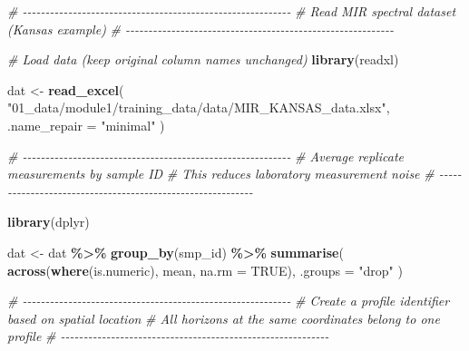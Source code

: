 \documentclass[
  10pt,
  b5paper,
  oneside]{book}
\newenvironment{Shaded}{\begin{snugshade}}{\end{snugshade}}
\newcommand{\AttributeTok}[1]{\textcolor[rgb]{0.13,0.29,0.53}{#1}}
\newcommand{\CommentTok}[1]{\textcolor[rgb]{0.56,0.35,0.01}{\textit{#1}}}
\newcommand{\ConstantTok}[1]{\textcolor[rgb]{0.56,0.35,0.01}{#1}}
\newcommand{\FunctionTok}[1]{\textcolor[rgb]{0.13,0.29,0.53}{\textbf{#1}}}
\newcommand{\NormalTok}[1]{#1}
\newcommand{\OtherTok}[1]{\textcolor[rgb]{0.56,0.35,0.01}{#1}}
\newcommand{\SpecialCharTok}[1]{\textcolor[rgb]{0.81,0.36,0.00}{\textbf{#1}}}
\newcommand{\StringTok}[1]{\textcolor[rgb]{0.31,0.60,0.02}{#1}}
\begin{document}
\begin{Shaded}
\begin{Highlighting}[]
\CommentTok{\# {-}{-}{-}{-}{-}{-}{-}{-}{-}{-}{-}{-}{-}{-}{-}{-}{-}{-}{-}{-}{-}{-}{-}{-}{-}{-}{-}{-}{-}{-}{-}{-}{-}{-}{-}{-}{-}{-}{-}{-}{-}{-}{-}{-}{-}{-}{-}{-}{-}{-}{-}{-}{-}{-}{-}{-}{-}{-}{-}}
\CommentTok{\# Read MIR spectral dataset (Kansas example)}
\CommentTok{\# {-}{-}{-}{-}{-}{-}{-}{-}{-}{-}{-}{-}{-}{-}{-}{-}{-}{-}{-}{-}{-}{-}{-}{-}{-}{-}{-}{-}{-}{-}{-}{-}{-}{-}{-}{-}{-}{-}{-}{-}{-}{-}{-}{-}{-}{-}{-}{-}{-}{-}{-}{-}{-}{-}{-}{-}{-}{-}{-}}

\CommentTok{\# Load data (keep original column names unchanged)}
\FunctionTok{library}\NormalTok{(readxl)}

\NormalTok{dat }\OtherTok{\textless{}{-}} \FunctionTok{read\_excel}\NormalTok{(}
  \StringTok{"01\_data/module1/training\_data/data/MIR\_KANSAS\_data.xlsx"}\NormalTok{,}
  \AttributeTok{.name\_repair =} \StringTok{"minimal"}
\NormalTok{)}

\CommentTok{\# {-}{-}{-}{-}{-}{-}{-}{-}{-}{-}{-}{-}{-}{-}{-}{-}{-}{-}{-}{-}{-}{-}{-}{-}{-}{-}{-}{-}{-}{-}{-}{-}{-}{-}{-}{-}{-}{-}{-}{-}{-}{-}{-}{-}{-}{-}{-}{-}{-}{-}{-}{-}{-}{-}{-}{-}{-}{-}{-}}
\CommentTok{\# Average replicate measurements by sample ID}
\CommentTok{\# This reduces laboratory measurement noise}
\CommentTok{\# {-}{-}{-}{-}{-}{-}{-}{-}{-}{-}{-}{-}{-}{-}{-}{-}{-}{-}{-}{-}{-}{-}{-}{-}{-}{-}{-}{-}{-}{-}{-}{-}{-}{-}{-}{-}{-}{-}{-}{-}{-}{-}{-}{-}{-}{-}{-}{-}{-}{-}{-}{-}{-}{-}{-}{-}{-}{-}{-}}

\FunctionTok{library}\NormalTok{(dplyr)}

\NormalTok{dat }\OtherTok{\textless{}{-}}\NormalTok{ dat }\SpecialCharTok{\%\textgreater{}\%}
  \FunctionTok{group\_by}\NormalTok{(smp\_id) }\SpecialCharTok{\%\textgreater{}\%}
  \FunctionTok{summarise}\NormalTok{(}
    \FunctionTok{across}\NormalTok{(}\FunctionTok{where}\NormalTok{(is.numeric), mean, }\AttributeTok{na.rm =} \ConstantTok{TRUE}\NormalTok{),}
    \AttributeTok{.groups =} \StringTok{"drop"}
\NormalTok{  )}

\CommentTok{\# {-}{-}{-}{-}{-}{-}{-}{-}{-}{-}{-}{-}{-}{-}{-}{-}{-}{-}{-}{-}{-}{-}{-}{-}{-}{-}{-}{-}{-}{-}{-}{-}{-}{-}{-}{-}{-}{-}{-}{-}{-}{-}{-}{-}{-}{-}{-}{-}{-}{-}{-}{-}{-}{-}{-}{-}{-}{-}{-}}
\CommentTok{\# Create a profile identifier based on spatial location}
\CommentTok{\# All horizons at the same coordinates belong to one profile}
\CommentTok{\# {-}{-}{-}{-}{-}{-}{-}{-}{-}{-}{-}{-}{-}{-}{-}{-}{-}{-}{-}{-}{-}{-}{-}{-}{-}{-}{-}{-}{-}{-}{-}{-}{-}{-}{-}{-}{-}{-}{-}{-}{-}{-}{-}{-}{-}{-}{-}{-}{-}{-}{-}{-}{-}{-}{-}{-}{-}{-}{-}}


\end{Highlighting}
\end{Shaded}
\end{document}
